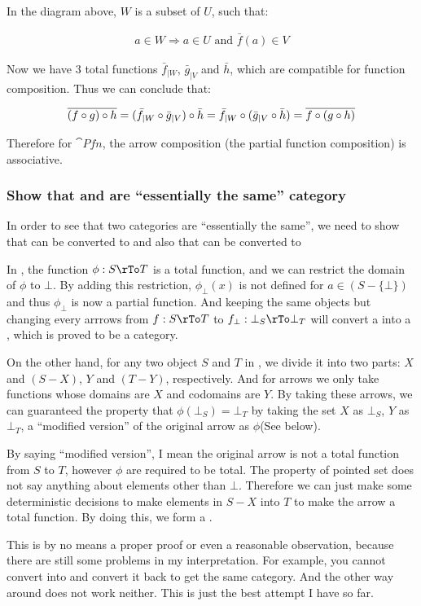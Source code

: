 \documentclass[11pt]{article}
\begin{document}
In the diagram above, $W$ is a subset of $U$, such that:

\begin{align*}
a \in W \Rightarrow a \in U \text{ and } \bar{f}(a) \in V
\end{align*}

Now we have 3 total functions $\bar{f}_{|W}$, $\bar{g}_{|V}$ and $\bar{h}$,
which are compatible for function composition. Thus we can conclude that:

\begin{align*}
\overline{(f \circ g) \circ h} =
(\bar{f}_{|W} \circ \bar{g}_{|V}) \circ \bar{h} =
\bar{f}_{|W} \circ (\bar{g}_{|V} \circ \bar{h}) =
\overline{f \circ (g \circ h)}
\end{align*}

Therefore for $\cat{Pfn}$, the arrow composition (the partial function composition)
is associative.

{%
\newcommand{\setbot}{}
\subsubsection{Show that \setbot and 
are ``essentially the same'' category}

In order to see that two categories are ``essentially the same'',
we need to show that \setbot can be converted to 
and also that  can be converted to \setbot

In \setbot, the function $\phi : S \rTo T$ is a total function,
and we can restrict the domain of $\phi$ to ${\bot}$.
By adding this restriction, $\phi_\bot(x)$ is not defined for $a \in (S - \{\bot\})$
and thus $\phi_\bot$ is now a partial function. And keeping the same objects but
changing every arrrows from $f : S \rTo T$ to $f_\bot : \bot_S \rTo \bot_T$
will convert a \setbot into a , which is proved to be a category.

On the other hand, for any two object $S$ and $T$ in , we divide it into two parts:
$X$ and $(S - X)$, $Y$ and $(T - Y)$, respectively.
And for arrows we only take functions whose domains are $X$ and codomains are $Y$.
By taking these arrows, we can guaranteed the property that $\phi(\bot_S) = \bot_T$
by taking the set $X$ as $\bot_S$, $Y$ as $\bot_T$, a ``modified version'' of
the original arrow as $\phi$(See below).

By saying ``modified version'', I mean the original arrow is not a total function
from $S$ to $T$, however $\phi$ are required to be total. The property of pointed
set does not say anything about elements other than $\bot$. Therefore we can just
make some deterministic decisions to make elements in $S - X$ into $T$ to make
the arrow a total function. By doing this, we form a \setbot.

This is by no means a proper proof or even a reasonable observation,
because there are still some problems in my interpretation. For example,
you cannot convert  into \setbot and convert it back to get the same category.
And the other way around does not work neither. This is just the best attempt I have so far.
}%
\end{document}
